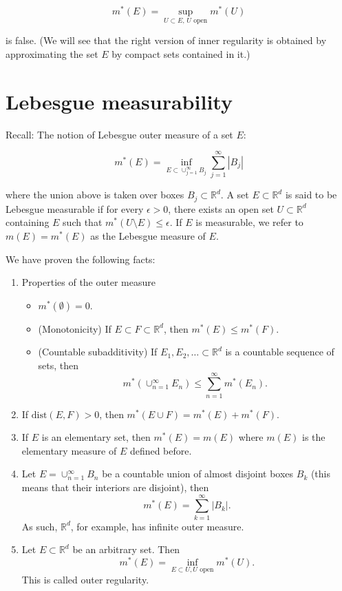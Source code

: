 \documentclass[lang=cn,11pt]{template}
\begin{document}
\[
m^*(E) = \sup_{U \subset E, \, U \text{ open}} m^*(U)
\]

is false. (We will see that the right version of inner regularity is obtained by approximating the set $E$ by compact sets contained in it.)


\newpage
\chapter{Lebesgue measurability}

Recall: The notion of Lebesgue outer measure of a set \( E \):

\[
m^*(E) = \inf_{E \subset \cup_{j=1}^{\infty} B_j} \sum_{j=1}^{\infty} |B_j|
\]

where the union above is taken over boxes \( B_j \subset \mathbb{R}^d \). A set \( E \subset \mathbb{R}^d \) is said to be Lebesgue measurable if for every \( \epsilon > 0 \), there exists an open set \( U \subset \mathbb{R}^d \) containing \( E \) such that \( m^*(U \setminus E) \leq \epsilon \). If \( E \) is measurable, we refer to \( m(E) = m^*(E) \) as the Lebesgue measure of \( E \).

We have proven the following facts:

\begin{enumerate}
    \item Properties of the outer measure
    \begin{itemize}
        \item \( m^*(\emptyset) = 0 \).
        \item (Monotonicity) If \( E \subset F \subset \mathbb{R}^d \), then \( m^*(E) \leq m^*(F) \).
        \item (Countable subadditivity) If \( E_1, E_2, \ldots \subset \mathbb{R}^d \) is a countable sequence of sets, then
        \[
        m^*\left(\cup_{n=1}^{\infty} E_n\right) \leq \sum_{n=1}^{\infty} m^*(E_n).
        \]
    \end{itemize}
    \item If \( \text{dist}(E, F) > 0 \), then \( m^*(E \cup F) = m^*(E) + m^*(F) \).
    \item If \( E \) is an elementary set, then \( m^*(E) = m(E) \) where \( m(E) \) is the elementary measure of \( E \) defined before.
    \item Let \( E = \cup_{n=1}^{\infty} B_n \) be a countable union of almost disjoint boxes \( B_k \) (this means that their interiors are disjoint), then
    \[
    m^*(E) = \sum_{k=1}^{\infty} |B_k|.
    \]
    As such, \( \mathbb{R}^d \), for example, has infinite outer measure.
    \item Let \( E \subset \mathbb{R}^d \) be an arbitrary set. Then
    \[
    m^*(E) = \inf_{E \subset U, U \text{ open}} m^*(U).
    \]
    This is called outer regularity.
\end{enumerate}
\end{document}
